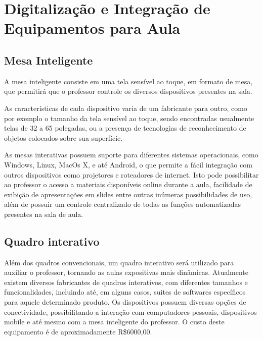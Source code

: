 \section{Digitalização e Integração de Equipamentos para Aula}

\subsection{Mesa Inteligente}

A mesa inteligente consiste em uma tela sensível ao toque, em formato de mesa, que permitirá que o professor controle os diversos dispositivos presentes na sala.

As características de cada dispositivo varia de um fabricante para outro, como por exemplo o tamanho da tela sensível ao toque, sendo encontradas usualmente telas de 32 a 65 polegadas, ou a presença de tecnologias de reconhecimento de objetos colocados sobre sua superfície.

As mesas interativas possuem suporte para diferentes sistemas operacionais, como Windows, Linux, MacOs X, e até Android, o que permite a fácil integração com outros dispositivos como projetores e roteadores de internet. Isto pode possibilitar ao professor o acesso a materiais disponíveis online durante a aula, facilidade de exibição de apresentações em slides entre outras inúmeras possibilidades de uso, além de possuir um controle centralizado de todas as funções automatizadas presentes na sala de aula.

\subsection{Quadro interativo}

Além dos quadros convencionais, um quadro interativo será utilizado para auxiliar o professor, tornando as aulas expositivas mais dinâmicas. Atualmente existem diversos fabricantes de quadros interativos, com diferentes tamanhos e funcionalidades, incluindo até, em alguns casos, suites de softwares específicos para aquele determinado produto. Os dispositivos possuem diversas opções de conectividade, possibilitando a interação com computadores pessoais, dispositivos mobile e até mesmo com a mesa inteligente do professor. O custo deste equipamento é de aproximadamente R\$6000,00.

